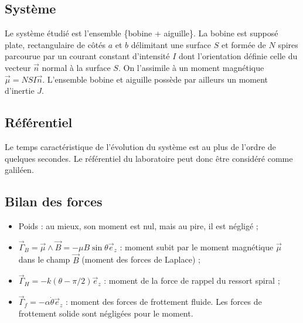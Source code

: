 \documentclass[12pt,a4paper,fleqn]{article}
\newcommand{\ez}{\vec{e}_z}
\begin{document}
\begin{center}
\end{center}


\subsection{Système}

Le système étudié est l'ensemble \{bobine + aiguille\}.
La bobine est supposé plate, rectangulaire de côtés $a$ et $b$ délimitant une surface $S$ et formée de $N$ spires parcourue par un courant constant d'intensité $I$ dont l'orientation définie celle du vecteur $\vec{n}$ normal à la surface $S$.
On l'assimile à un moment magnétique $\vec{\mu} = NSI\vec{n}$.
L'ensemble bobine et aiguille possède par ailleurs un moment d'inertie $J$.

\subsection{Référentiel}

Le temps caractéristique de l'évolution du système est au plus de l'ordre de quelques secondes.
Le référentiel du laboratoire peut donc être considéré comme galiléen.

\subsection{Bilan des forces}

\begin{itemize}
\item Poids : au mieux, son moment est nul, mais au pire, il est négligé ;
\item $\vec{\Gamma}_B = \vec{\mu} \wedge \vec{B} = - \mu B \sin \theta \ez$ : moment subit par le moment magnétique $\vec{\mu}$ dans le champ $\vec{B}$ (moment des forces de Laplace) ;
\item $\vec{\Gamma}_H = -k(\theta-\pi/2)\ez$ : moment de la force de rappel du ressort spiral ;
\item $\vec{\Gamma}_f = -\alpha\dot{\theta}\ez$ : moment des forces de frottement fluide.
Les forces de frottement solide sont négligées pour le moment.
\end{itemize}
\end{document}
